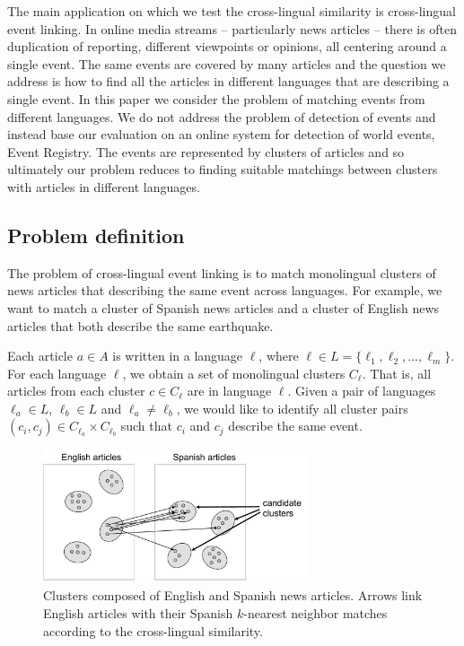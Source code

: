 \documentclass[twoside,11pt]{article}
\begin{document}
The main application on which we test the cross-lingual similarity is cross-lingual event linking. In online media streams -- particularly news articles -- there is often duplication of reporting, different viewpoints or opinions, all centering around a single event. The same events are covered by many articles and the question we address is how to find all the articles in different languages that are describing a single event. In this paper we consider the problem of matching events from different languages. We do not address the problem of detection of events and instead base our evaluation on an online system for detection of world events, Event Registry. The events are represented by clusters of articles and so ultimately our problem reduces to finding suitable matchings between clusters with articles in different languages.

\subsection{Problem definition}

The problem of cross-lingual event linking is to match monolingual clusters of news articles that describing the same event across languages. For example, we want to match a cluster of Spanish news articles and a cluster of English news articles that both describe the same earthquake.

Each article $a \in A$ is written in a language $\ell$, where $\ell \in L = \{\ell_1,\ell_2,...,\ell_m\}$. For each language $\ell$, we obtain a set of monolingual clusters $C_{\ell}$. That is, all articles from each cluster $c \in C_{\ell}$ are in language $\ell$. Given a pair of languages $\ell_a \in L$, $\ell_b \in L$ and $\ell_a \not= \ell_b$, we would like to identify all cluster pairs $(c_i, c_j) \in C_{\ell_a} \times C_{\ell_b}$ such that $c_i$ and $c_j$ describe the same event.

\begin{figure}[tb]
\centering
\includegraphics[width=0.7\textwidth]{clusters.pdf}
\caption{\label{fig:clusters}  Clusters composed of English and Spanish news articles. Arrows link English articles with their Spanish $k$-nearest neighbor matches according to the cross-lingual similarity.}
\end{figure}
\end{document}
